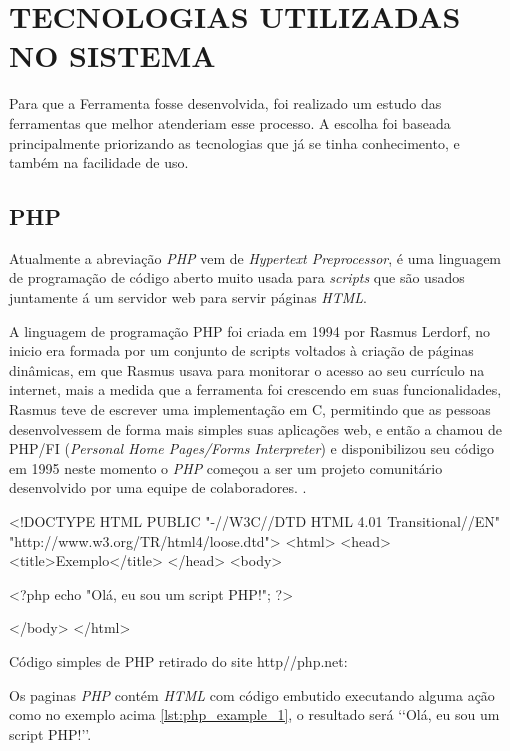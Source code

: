 \chapter{TECNOLOGIAS UTILIZADAS NO SISTEMA}

Para que a Ferramenta fosse desenvolvida, foi realizado um estudo das ferramentas que melhor atenderiam esse processo. A escolha foi baseada principalmente priorizando as tecnologias que já se tinha conhecimento, e também na facilidade de uso.

\section{PHP}

Atualmente a abreviação \textit{PHP} vem de \textit{Hypertext Preprocessor}, é uma linguagem de programação de código aberto muito usada para \textit{scripts} que são usados juntamente á um servidor web para servir páginas \textit{HTML}.
\par
A linguagem de programação PHP foi criada em 1994 por Rasmus Lerdorf, no inicio era formada por um conjunto de scripts voltados à criação de páginas dinâmicas, em que Rasmus usava para monitorar o acesso ao seu currículo na internet, mais a medida que a ferramenta foi crescendo em suas funcionalidades, Rasmus teve de escrever uma implementação em C, permitindo que as pessoas desenvolvessem de forma mais simples suas aplicações web, e então a chamou de PHP/FI (\textit{Personal Home Pages/Forms Interpreter}) e disponibilizou seu código em 1995 neste momento o \textit{PHP} começou a ser um projeto comunitário desenvolvido por uma equipe de colaboradores. \cite[p.~20]{pablo-php}.
\par
\begin{listing}
    \begin{phpcode}
    <!DOCTYPE HTML PUBLIC "-//W3C//DTD HTML 4.01 Transitional//EN"
    "http://www.w3.org/TR/html4/loose.dtd">
    <html>
        <head>
            <title>Exemplo</title>
        </head>
        <body>
    
        <?php
            echo "Olá, eu sou um script PHP!";
        ?>
    
        </body>
    </html>
    \end{phpcode}
    \caption{Código simples de PHP retirado do site http//php.net:}
    \label{lst:php_example_1}
\end{listing}
\par
Os paginas \textit{PHP} contém \textit{HTML} com código embutido executando alguma ação como no exemplo acima \ref{lst:php_example_1}, o resultado será \lq\lq Olá, eu sou um script PHP!\rq\rq.
